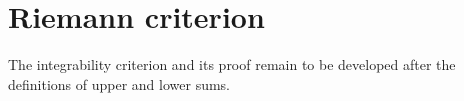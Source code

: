 \section{Riemann criterion}
\label{sec:analysis-i:riemann-criterion}

The integrability criterion and its proof remain
to be developed after the definitions of upper and lower sums.
